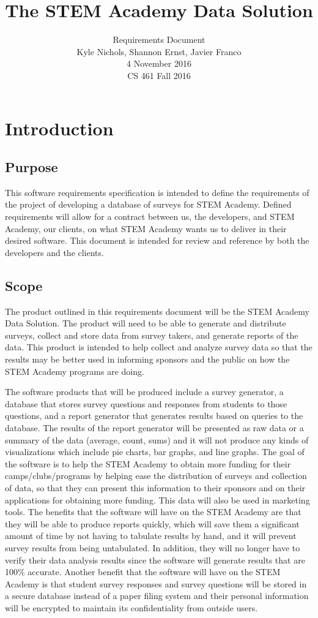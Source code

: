 \documentclass[letterpaper,10pt,serif, draftclsnofoot,onecolumn, compsoc, titlepage]{IEEEtran}
\title{The STEM Academy Data Solution}
\author{Requirements Document \\ Kyle Nichols, Shannon Ernst, Javier Franco\\ 4 November 2016\\ CS 461 Fall 2016}
\begin{document}
\maketitle
\newpage
\section{Introduction}
\subsection{Purpose}
This software requirements specification is intended to define the requirements of the project of developing a database 
of surveys for STEM Academy. Defined requirements will allow for a contract between us, the developers, and STEM Academy, 
our clients, on what STEM Academy wants us to deliver in their desired software. This document is intended for review and
reference by both the developers and the clients.
\subsection{Scope}
The product outlined in this requirements document will be the STEM Academy Data Solution. The product will need to be able
to generate and distribute surveys, collect and store data from survey takers, and generate reports of the data.  This product
is intended to help collect and analyze survey data so that the results may be better used in informing sponsors and the public on
how the STEM Academy programs are doing. 

The software products that will be produced include a survey generator, a database that stores survey questions and responses from students to those questions, and a report generator that generates results based on queries to the database.  
The results of the report generator will be presented as raw data or a summary of the data (average, count, sums) and it will not produce any kinds of visualizations which include pie charts, bar graphs, and line graphs.  
The goal of the software is to help the STEM Academy to obtain more funding for their camps/clubs/programs by helping ease the distribution of surveys and collection of data, so that they can present this information to their sponsors and on their applications for obtaining more funding. This data will also be used in marketing tools. 
The benefits that the software will have on the STEM Academy are that they will be able to produce reports quickly, which will save them a significant amount of time by not having to tabulate results by hand, and it will prevent survey results from being untabulated.
 In addition, they will no longer have to verify their data analysis results since the software will generate results that are 100\% accurate.
 Another benefit that the software will have on the STEM Academy is that student survey responses and survey questions will be stored in a secure database instead of a paper filing system and their personal information will be encrypted to maintain its confidentiality from outside users. 
\end{document}
